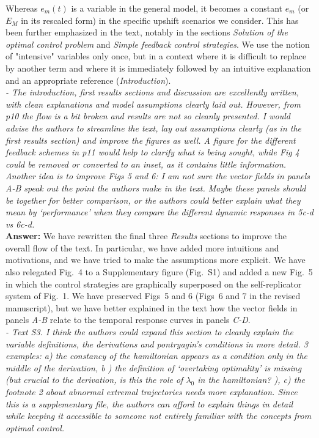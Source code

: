 \documentclass[11pt]{article}
\begin{document}
Whereas $e_m(t)$ is a variable in the general model, it becomes a constant $e_m$ (or $E_M$ in its rescaled form) in the specific upshift scenarios we consider. This has been further emphasized in the text, notably in the sections \textit{Solution of the optimal control problem} and \textit{Simple feedback control strategies}. We use the notion of "intensive" variables only once, but in a context where it is difficult to replace by another term and where it is immediately followed by an intuitive explanation and an appropriate reference (\textit{Introduction}).\\


\textit{- The introduction, first results sections and discussion are excellently written, with clean explanations and model assumptions clearly laid out. However, from p10 the flow is a bit broken and results are not so cleanly presented. I would advise the authors to streamline the text, lay out assumptions clearly (as in the first results section) and improve the figures as well. A figure for the different feedback schemes in p11 would help to clarify what is being sought, while Fig 4 could be removed or converted to an inset, as it contains little information. Another idea is to improve Figs 5 and 6: I am not sure the vector fields in panels A-B speak out the point the authors make in the text. Maybe these panels should be together for better comparison, or the authors could better explain what they mean by ‘performance’ when they compare the different dynamic responses in 5c-d vs 6c-d.} \\

\noindent\textbf{Answer:} We have rewritten the final three \textit{Results} sections to improve the overall flow of the text. In particular, we have added more intuitions and motivations, and we have tried to make the assumptions more explicit. We have also relegated Fig.~4 to a Supplementary figure (Fig.~S1) and added a new Fig.~5 in which the control strategies are graphically superposed on the self-replicator system of Fig.~1. We have preserved Figs~5 and 6 (Figs~6 and 7 in the revised manuscript), but we have better explained in the text how the vector fields in panels \textit{A-B} relate to the temporal response curves in panels \textit{C-D}.  \\


\textit{- Text S3. I think the authors could expand this section to cleanly explain the variable definitions, the derivations and pontryagin’s conditions in more detail. 3 examples: a) the constancy of the hamiltonian appears as a condition only in the middle of the derivation, b ) the definition of ‘overtaking optimality’ is missing (but crucial to the derivation, is this the role of $\lambda_0$ in the hamiltonian? ), c) the footnote 2 about abnormal extremal trajectories needs more explanation. Since this is a supplementary file, the authors can afford to explain things in detail while keeping it accessible to someone not entirely familiar with the concepts from optimal control.} \\
\end{document}
